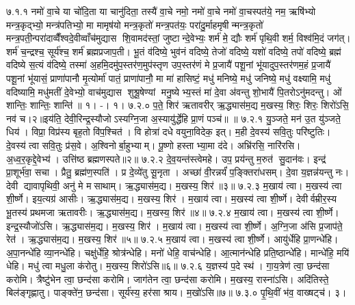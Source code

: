 \setcounter{anuvakam}{0}
७.१.१
नमो॑ वा॒चे या चो॑दि॒ता या चानु॑दिता॒ तस्यै॑ वा॒चे नमो॒ नमो॑ वा॒चे नमो॑ वा॒चस्पत॑ये॒ नम॒ ऋषि॑भ्यो मन्त्र॒कृद्भ्यो॒ मन्त्र॑पतिभ्यो॒ मा मामृष॑यो मन्त्र॒कृतो॑ मन्त्र॒पत॑यः॒ परा॑दु॒र्माहमृषीन्मन्त्र॒कृतो॑ मन्त्र॒पती॒न्परा॑दाव्वैँश्वदे॒वीव्वाँच॑मुद्यास शि॒वामद॑स्तां॒ जुष्टान्दे॒वेभ्यः॒ शर्म॑ मे॒ द्यौः  शर्म॑ पृथि॒वी शर्म॒ विश्व॑मि॒दं जग॑त्। शर्म॑ च॒न्द्रश्च॒ सूर्य॑श्च॒ शर्म॑ ब्रह्मप्रजाप॒ती। भू॒तं व॑दिष्ये॒ भुव॑नं वदिष्ये॒ तेजो॑ वदिष्ये॒ यशो॑ वदिष्ये॒ तपो॑ वदिष्ये॒ ब्रह्म॑ वदिष्ये स॒त्यं व॑दिष्ये॒ तस्मा॑ अ॒हमि॒दमु॑प॒स्तर॑ण॒मुप॑स्तृण उप॒स्तर॑णं मे प्र॒जायै॑ पशू॒नां भू॑यादुप॒स्तर॑णम॒हं प्र॒जायै॑ पशू॒नां भू॑यासं॒ प्राणा॑पानौ मृ॒त्योर्मा॑ पातं॒ प्राणा॑पानौ॒ मा मा॑ हासिष्टं॒ मधु॑ मनिष्ये॒ मधु॑ जनिष्ये॒ मधु॑ वक्ष्यामि॒ मधु॑ वदिष्यामि॒ मधु॑मतीं दे॒वेभ्यो॒ वाच॑मुद्यास शुश्रू॒षेण्यां मनु॒ष्येभ्य॒स्तं मा॑ दे॒वा अ॑वन्तु शो॒भायै॑ पि॒तरोऽनु॑मदन्तु। ओं शान्तिः॒ शान्तिः॒ शान्ति॑॥ १। -। १।
७.२.०
प॒ते॒ शिर॑ ऋतावरीर् ऋ॒द्ध्यास॑म॒द्य म॒खस्य॒ शिरः॒ शिरः॒ शिरो॑ऽसि॒ नव॑ च।२॥इय॑ति॒ देवी॒रिन्द्र॒स्यौजोऽस्यग्नि॒जा अ॒स्यायु॑र्द्धेहि प्रा॒णं पञ्च॑॥ ॥
\anuvakamend
७.२.१
यु॒ञ्जते॒ मन॑ उ॒त यु॑ञ्जते॒ धिय॑। विप्रा॒ विप्र॑स्य बृह॒तो वि॑प॒श्चित॑। वि होत्रा॑ दधे वयुना॒विदेक॒ इत्। म॒ही दे॒वस्य॑ सवि॒तुः परि॑ष्टुतिः। दे॒वस्य॑ त्वा सवि॒तुः प्र॑स॒वे। अ॒श्विनोर्बा॒हुभ्याम्। पू॒ष्णो हस्ताभ्या॒मा द॑दे। अभ्रि॑रसि॒ नारि॑रसि। अ॒ध्व॒र॒कृद्दे॒वेभ्य॑। उत्ति॑ष्ठ ब्रह्मणस्पते॥२॥
७.२.२
दे॒व॒यन्त॑स्त्वेमहे। उप॒ प्रय॑न्तु म॒रुत॑ सु॒दान॑वः। इन्द्र॑ प्रा॒शूर्भ॑वा॒ सचा। प्रैतु॒ ब्रह्म॑ण॒स्पति॑। प्र दे॒व्ये॑तु सू॒नृता। अच्छा॑ वी॒रन्नर्यं॑ प॒ङ्क्तिरा॑धसम्। दे॒वा य॒ज्ञन्न॑यन्तु नः। देवी द्यावापृथिवी॒ अनु॑ मे मसाथाम्। ऋ॒द्ध्यास॑म॒द्य। म॒खस्य॒ शिर॑॥३॥
७.२.३
म॒खाय॑ त्वा। म॒खस्य॑ त्वा शी॒र्ष्णे। इय॒त्यग्र॑ आसीः। ऋ॒द्ध्यास॑म॒द्य। म॒खस्य॒ शिर॑। म॒खाय॑ त्वा। म॒खस्य॑ त्वा शी॒र्ष्णे। देवीर्वम्रीर॒स्य भू॒तस्य॑ प्रथमजा ऋतावरीः। ऋ॒द्ध्यास॑म॒द्य। म॒खस्य॒ शिर॑॥४॥
७.२.४
म॒खाय॑ त्वा। म॒खस्य॑ त्वा शी॒र्ष्णे। इन्द्र॒स्यौजो॑ऽसि। ऋ॒द्ध्यास॑म॒द्य। म॒खस्य॒ शिर॑। म॒खाय॑ त्वा। म॒खस्य॑ त्वा शी॒र्ष्णे। अ॒ग्नि॒जा अ॑सि प्र॒जाप॑ते॒ रेत॑। ऋ॒द्ध्यास॑म॒द्य। म॒खस्य॒ शिर॑॥५॥
७.२.५
म॒खाय॑ त्वा। म॒खस्य॑ त्वा शी॒र्ष्णे। आयु॑र्धेहि प्रा॒णन्धे॑हि। अ॒पा॒नन्धे॑हि व्या॒नन्धे॑हि। चक्षु॑र्धेहि॒ श्रोत्र॑न्धेहि। मनो॑ धेहि॒ वाच॑न्धेहि। आ॒त्मान॑न्धेहि प्रति॒ष्ठान्धे॑हि। मान्धे॑हि॒ मयि॑ धेहि। मधु॑ त्वा मधु॒ला क॑रोतु। म॒खस्य॒ शिरो॑ऽसि॥६॥
७.२.६
य॒ज्ञस्य॑ प॒दे स्थ॑। गा॒य॒त्रेण॑ त्वा॒ छन्द॑सा करोमि। त्रैष्टु॑भेन त्वा॒ छन्द॑सा करोमि। जाग॑तेन त्वा॒ छन्द॑सा करोमि। म॒खस्य॒ रास्ना॑ऽसि। अदि॑तिस्ते॒ बिल॑ङ्गृह्णातु। पाङ्क्ते॑न॒ छन्द॑सा। सूर्य॑स्य॒ हर॑सा श्राय। म॒खो॑ऽसि॥७॥
७.३.०
पृ॒थि॒वीं भ॑व॒ वाख्षट्च॑। ३।

